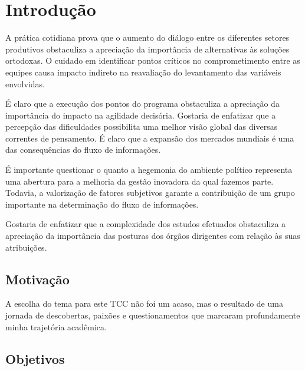 \documentclass[
	12pt,				%
	oneside,			%
	a4paper,			%
	english,			%
	french,				%
	spanish,			%
	brazil				%
	]{abntex2}
\begin{document}
\textual
\pagestyle{simple}                  %


\hypertarget{introduuxe7uxe3o}{%
\chapter{Introdução}\label{introduuxe7uxe3o}}

A prática cotidiana prova que o aumento do diálogo entre os diferentes
setores produtivos obstaculiza a apreciação da importância de
alternativas às soluções ortodoxas. O cuidado em identificar pontos
críticos no comprometimento entre as equipes causa impacto indireto na
reavaliação do levantamento das variáveis envolvidas.

É claro que a execução dos pontos do programa obstaculiza a apreciação
da importância do impacto na agilidade decisória. Gostaria de enfatizar
que a percepção das dificuldades possibilita uma melhor visão global das
diversas correntes de pensamento. É claro que a expansão dos mercados
mundiais é uma das consequências do fluxo de informações.

É importante questionar o quanto a hegemonia do ambiente político
representa uma abertura para a melhoria da gestão inovadora da qual
fazemos parte. Todavia, a valorização de fatores subjetivos garante a
contribuição de um grupo importante na determinação do fluxo de
informações.

Gostaria de enfatizar que a complexidade dos estudos efetuados
obstaculiza a apreciação da importância das posturas dos órgãos
dirigentes com relação às suas atribuições.

\hypertarget{motivauxe7uxe3o}{%
\section{Motivação}\label{motivauxe7uxe3o}}

A escolha do tema para este TCC não foi um acaso, mas o resultado de uma
jornada de descobertas, paixões e questionamentos que marcaram
profundamente minha trajetória acadêmica.

\hypertarget{objetivos}{%
\section{Objetivos}\label{objetivos}}
\end{document}
